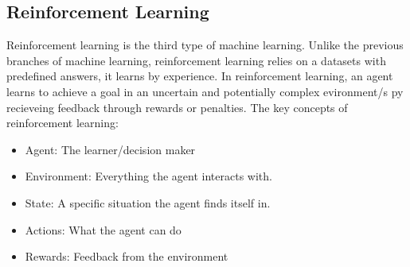 \subsection{Reinforcement Learning}
Reinforcement learning is the third type of machine learning.
Unlike the previous branches of machine learning,
reinforcement learning relies on a datasets with predefined answers, it learns by experience. 
In reinforcement learning, an agent learns to achieve a goal in 
an uncertain and potentially complex evironment/s py recieveing feedback 
through rewards or penalties. \cite{RL-GeeksForGeeks}
\newline
The key concepts of reinforcement learning: 
\begin{itemize}
    \item Agent: The learner/decision maker
    \item Environment: Everything the agent interacts with.
    \item State: A specific situation the agent finds itself in. 
    \item Actions: What the agent can do
    \item Rewards: Feedback from the environment
\end{itemize}

 


